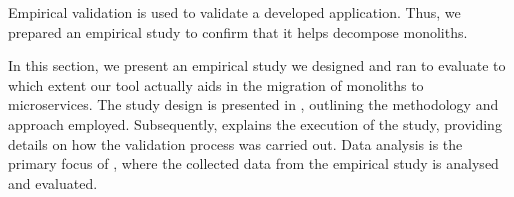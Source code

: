 Empirical validation is used to validate a developed application. Thus, we
prepared an empirical study to confirm that it helps decompose monoliths.

In this section, we present an empirical study we designed and ran to evaluate
to which extent our tool actually aids in the migration of monoliths to
microservices. The study design is presented in , outlining
the methodology and approach employed. Subsequently, 
explains the execution of the study, providing details on how the validation
process was carried out. Data analysis is the primary focus of
, where the collected data from the empirical study is
analysed and evaluated.
